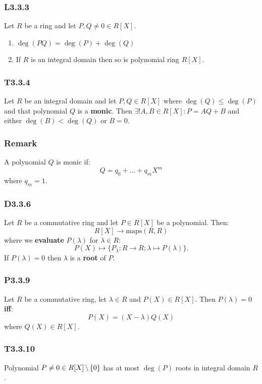 \documentclass{article}
\begin{document}
\begin{multicols*}{3}
\subsubsection*{L3.3.3}
Let $R$ be a ring and let $P,Q\neq0\in R[X]$.
\begin{enumerate}
    \item $\deg(PQ)=\deg(P)+\deg(Q)$
    \item If $R$ is an integral domain then
    so is polynomial ring $R[X]$.
\end{enumerate}

\subsubsection*{T3.3.4}
Let $R$ be an integral domain and
let $P,Q\in R[X]$ where $\deg(Q)\leq\deg(P)$
and that polynomial $Q$ is a \textbf{monic}.
Then $\exists!A,B\in R[X]:P=AQ+B$ and either
$\deg(B)<\deg(Q)$ or $B=0$.

\subsubsection*{Remark}
A polynomial $Q$ is monic if:
$$Q=q_0+\dots+q_m X^m$$
where $q_m=1$.

\subsubsection*{D3.3.6}
Let $R$ be a commutative ring and let $P\in R[X]$
be a polynomial. Then:
$$R[X]\rightarrow\text{maps}(R,R)$$
where we \textbf{evaluate} $P(\lambda)$ for $\lambda\in R$:
$$P(X)\mapsto\{P_{\lambda}:R\rightarrow R;
\lambda\mapsto P(\lambda)\}.$$
If $P(\lambda)=0$ then $\lambda$ is a 
\textbf{root} of $P$.

\subsubsection*{P3.3.9}
Let $R$ be a commutative ring, let $\lambda\in R$
and $P(X)\in R[X]$. Then $P(\lambda)=0$ \textbf{if{}f}:
$$P(X)=(X-\lambda)Q(X)$$
where $Q(X)\in R[X]$.

\subsubsection*{T3.3.10}
Polynomial
$P\neq0\in R[X]\hspace{0.02in}\backslash\hspace{0.02in}\{0\}$
has at most $\deg(P)$ roots in integral domain $R$.


\end{multicols*}
\end{document}
